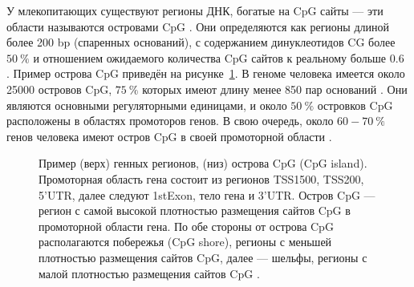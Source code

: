 У млекопитающих существуют регионы ДНК, богатые на CpG сайты --- эти области называются островами CpG \autocite{Bird1986}. Они определяются как регионы длиной более 200 bp (спаренных оснований), с содержанием динуклеотидов CG более $50~\%$ и отношением ожидаемого количества CpG сайтов к реальному больше $0.6$ \autocite{GardinerGarden1987}. Пример острова CpG приведён на рисунке~\cref{fig:CpG_Island}. В геноме человека имеется около 25000 островов CpG, $75~\%$  которых имеют длину менее 850 пар оснований \autocite{Lander2001}. Они являются основными регуляторными единицами, и около $50~\%$ островков CpG расположены в областях промоторов генов. В свою очередь, около $60-70~\%$ генов человека имеют остров CpG в своей промоторной области \autocite{Illingworth2010, Saxonov2006}.

\begin{figure}[ht]
	\caption[Пример острова CpG, региона с самой высокой плотностью размещения сайтов CpG в промоторной области гена.]{Пример (верх) генных регионов, (низ) острова CpG (CpG island). Промоторная область гена состоит из регионов TSS1500, TSS200, 5'UTR, далее следуют 1stExon, тело гена и 3'UTR. Остров CpG --- регион с самой высокой плотностью размещения сайтов CpG в промоторной области гена. По обе стороны от острова CpG располагаются побережья (CpG shore), регионы с меньшей плотностью размещения сайтов CpG, далее --- шельфы, регионы с малой плотностью размещения сайтов CpG \autocite{Wijnands2016}.}\label{fig:CpG_Island}
\end{figure}

